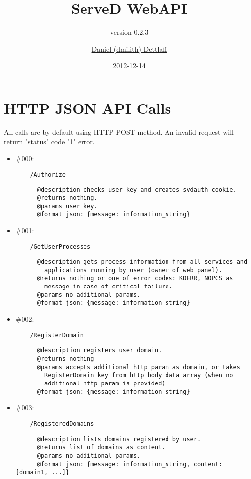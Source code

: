 \documentclass[11pt,a4paper]{scrartcl}
\title{ServeD WebAPI}
\author{\href{mailto:dmilith@verknowsys.com}{Daniel (dmilith) Dettlaff}}
\subtitle{version 0.2.3}
\date{2012-12-14}
\begin{document}
\maketitle

\section{HTTP JSON API Calls}\label{sec:apicalls}
  All calls are by default using HTTP POST method.
  An invalid request will return "status" code "1" error.

  \begin{itemize}

    \item \#000:
      \begin{verbatim}
    /Authorize
      \end{verbatim}
      \begin{verbatim}
      @description checks user key and creates svdauth cookie.
      @returns nothing.
      @params user key.
      @format json: {message: information_string}
      \end{verbatim}

    \item \#001:
      \begin{verbatim}
    /GetUserProcesses
      \end{verbatim}
      \begin{verbatim}
      @description gets process information from all services and
        applications running by user (owner of web panel).
      @returns nothing or one of error codes: KDERR, NOPCS as
        message in case of critical failure.
      @params no additional params.
      @format json: {message: information_string}
      \end{verbatim}

    \item \#002:
      \begin{verbatim}
    /RegisterDomain
      \end{verbatim}
      \begin{verbatim}
      @description registers user domain.
      @returns nothing
      @params accepts additional http param as domain, or takes
        RegisterDomain key from http body data array (when no
        additional http param is provided).
      @format json: {message: information_string}
      \end{verbatim}

    \item \#003:
      \begin{verbatim}
    /RegisteredDomains
      \end{verbatim}
      \begin{verbatim}
      @description lists domains registered by user.
      @returns list of domains as content.
      @params no additional params.
      @format json: {message: information_string, content: [domain1, ...]}
      \end{verbatim}


\end{itemize}
\end{document}
